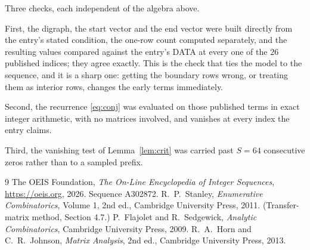 \documentclass[11pt,a4paper]{article}
\theoremstyle{plain}
\theoremstyle{definition}
\begin{document}
Three checks, each independent of the algebra above.

First, the digraph, the start vector and the end vector were built directly from the
entry's stated condition, the one-row count computed separately, and the resulting values
compared against the entry's DATA at every one of the $26$ published indices; they
agree exactly. This is the check that ties the model to the sequence, and it is a sharp one:
getting the boundary rows wrong, or treating them as interior rows, changes the early terms
immediately.

Second, the recurrence \eqref{eq:conj} was evaluated on those published terms in exact
integer arithmetic, with no matrices involved, and vanishes at every index the entry claims.

Third, the vanishing test of Lemma~\ref{lem:crit} was carried past $S=64$ consecutive
zeros rather than to a sampled prefix.

\begin{thebibliography}{9}
 The OEIS Foundation, \emph{The On-Line Encyclopedia of Integer
Sequences}, \url{https://oeis.org}, 2026. Sequence A302872.
 R.~P.~Stanley, \emph{Enumerative Combinatorics}, Volume 1, 2nd ed.,
Cambridge University Press, 2011. (Transfer-matrix method, Section 4.7.)
 P.~Flajolet and R.~Sedgewick, \emph{Analytic Combinatorics}, Cambridge
University Press, 2009.
 R.~A.~Horn and C.~R.~Johnson, \emph{Matrix Analysis}, 2nd ed., Cambridge
University Press, 2013.
\end{thebibliography}
\end{document}
